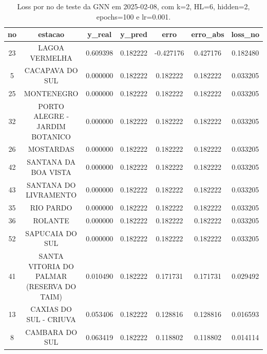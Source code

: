 \begin{table}[h]
\centering
\caption{Loss por no de teste da GNN em 2025-02-08, com k=2, HL=6, hidden=2, epochs=100 e lr=0.001.}
\label{tab:gnn_loss_k2_hl6_h2_e100_d20250208}
\begin{tabular}{ccccccc}
\toprule
no & estacao & y\_real & y\_pred & erro & erro\_abs & loss\_no \\
\midrule
23 & LAGOA VERMELHA & 0.609398 & 0.182222 & -0.427176 & 0.427176 & 0.182480 \\
5 & CACAPAVA DO SUL & 0.000000 & 0.182222 & 0.182222 & 0.182222 & 0.033205 \\
25 & MONTENEGRO & 0.000000 & 0.182222 & 0.182222 & 0.182222 & 0.033205 \\
32 & PORTO ALEGRE - JARDIM BOTANICO & 0.000000 & 0.182222 & 0.182222 & 0.182222 & 0.033205 \\
26 & MOSTARDAS & 0.000000 & 0.182222 & 0.182222 & 0.182222 & 0.033205 \\
42 & SANTANA DA BOA VISTA & 0.000000 & 0.182222 & 0.182222 & 0.182222 & 0.033205 \\
43 & SANTANA DO LIVRAMENTO & 0.000000 & 0.182222 & 0.182222 & 0.182222 & 0.033205 \\
35 & RIO PARDO & 0.000000 & 0.182222 & 0.182222 & 0.182222 & 0.033205 \\
36 & ROLANTE & 0.000000 & 0.182222 & 0.182222 & 0.182222 & 0.033205 \\
52 & SAPUCAIA DO SUL & 0.000000 & 0.182222 & 0.182222 & 0.182222 & 0.033205 \\
41 & SANTA VITORIA DO PALMAR (RESERVA DO TAIM) & 0.010490 & 0.182222 & 0.171731 & 0.171731 & 0.029492 \\
13 & CAXIAS DO SUL - CRIUVA & 0.053406 & 0.182222 & 0.128816 & 0.128816 & 0.016593 \\
8 & CAMBARA DO SUL & 0.063419 & 0.182222 & 0.118802 & 0.118802 & 0.014114 \\
\bottomrule
\end{tabular}
\end{table}
